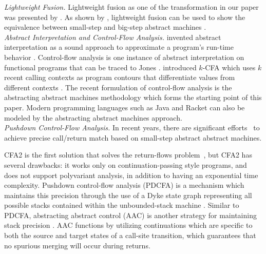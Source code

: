 \documentclass[acmsmall, review]{acmart}\settopmatter{}
\begin{document}
\textit{Lightweight Fusion.}
Lightweight fusion as one of the transformation in our paper was presented by 
\citeauthor{Ohori:2007:LFF:1190216.1190241} \cite{Ohori:2007:LFF:1190216.1190241}.
As shown by \citeauthor{DANVY2008100}, lightweight fusion can be used to show the 
equivalence between small-step and big-step abstract machines \cite{DANVY2008100}.\\

\textit{Abstract Interpretation and Control-Flow Analysis.}
\citeauthor{cousot1977abstract} invented abstract interpretation as a sound approach to
approximate a program's run-time behavior \cite{cousot1977abstract}. Control-flow analysis
is one instance of abstract interpretation on functional programs that can be traced to
Jones \cite{jones1981flow}. \citeauthor{Shivers:1988:CFA:53990.54007} introduced $k$-CFA
which uses $k$ recent calling contexts as program contours that differentiate values from
different contexts \cite{Shivers:1988:CFA:53990.54007, Shivers:1991:SSC:115865.115884}.
The recent formulation of control-flow analysis is the abstracting abstract machines
methodology \cite{van2012systematic, van2010abstracting} which forms the starting point
of this paper. Modern programming languages such as Java \cite{might2010resolving} and
Racket \cite{Tobin-Hochstadt:2012:HSE:2384616.2384655} can also be modeled by the abstracting
abstract machines approach. \\

\textit{Pushdown Control-Flow Analysis.}
In recent years, there are significant efforts~\cite{vardoulakis2010cfa2, earl2012introspective,
gilray2016pushdown, johnson2015abstracting} to achieve precise call/return match based on small-step
abstract abstract machines.

CFA2 is the first solution that solves the return-flows problem~\cite{vardoulakis2010cfa2},
but CFA2 has several drawbacks: it works only on continuation-passing style programs, and
does not support polyvariant analysis, in addition to having an exponential time complexity.
Pushdown control-flow analysis (PDCFA) is a mechanism which maintains this precision through
the use of a Dyke state graph representing all possible stacks contained within the unbounded-stack
machine \cite{earl2012introspective, earl2010pushdown}. Similar to PDCFA, abstracting abstract
control (AAC) is another strategy for maintaining stack precision \cite{johnson2015abstracting}.
AAC functions by utilizing continuations which are specific to both the source and target states
of a call-site transition, which guarantees that no spurious merging will occur during returns.
\end{document}
